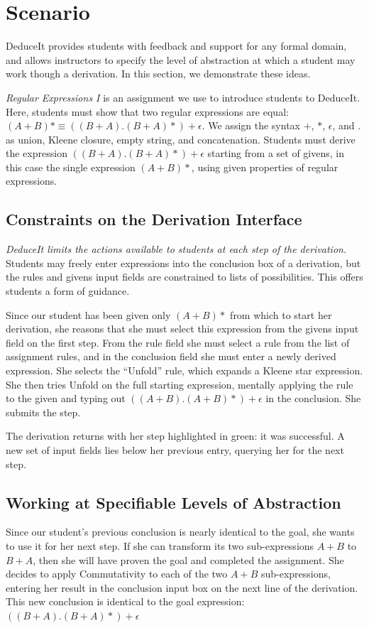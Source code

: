 \documentclass{sigchi}
\begin{document}
\section{Scenario}
DeduceIt provides students with feedback and support for any formal domain, and allows instructors to specify the level of abstraction at which a student may work though a derivation. In this section, we demonstrate these ideas. 

\textit{Regular Expressions I} is an assignment we use to introduce students to DeduceIt. Here, students must show that two regular expressions are equal: $(A+B)* \equiv ((B+A).(B+A)*)+\epsilon$. We assign the syntax $+$, $*$, $\epsilon$, and $.$ as union, Kleene closure, empty string, and concatenation. Students must derive the expression $((B+A).(B+A)*)+\epsilon$ starting from a set of givens, in this case the single expression $(A+B)*$, using given properties of regular expressions.

\subsection{Constraints on the Derivation Interface}

\textit{DeduceIt limits the actions available to students at each step of the derivation}. Students may freely enter expressions into the conclusion box of a derivation, but the rules and givens input fields are constrained to lists of possibilities. This offers students a form of guidance.

Since our student has been given only $(A+B)*$ from which to start her derivation, she reasons that she must select this expression from the givens input field on the first step. From the rule field she must select a rule from the list of assignment rules, and in the conclusion field she must enter a newly derived expression. She selects the ``Unfold'' rule, which expands a Kleene star expression. She then tries Unfold on the full starting expression, mentally applying the rule to the given and typing out $((A + B).(A + B)*)+\epsilon$ in the conclusion. She submits the step. 

The derivation returns with her step highlighted in green: it was successful. A new set of input fields lies below her previous entry, querying her for the next step.

\subsection{Working at Specifiable Levels of Abstraction}
Since our student's previous conclusion is nearly identical to the goal, she wants to use it for her next step. If she can transform its two sub-expressions $A+B$ to $B+A$, then she will have proven the goal and completed the assignment. She decides to apply Commutativity to each of the two $A+B$ sub-expressions, entering her result in the conclusion input box on the next line of the derivation. This new conclusion is identical to the goal expression: $((B+A).(B+A)*)+\epsilon$
\end{document}

